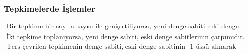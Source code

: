 \subsubsection*{Tepkimelerde İşlemler}
\begin{equation*}
  \begin{aligned}
    \text{Bir tepkime bir sayı n sayısı ile genişletiliyorsa, yeni denge sabiti eski denge sabitinin n üssü alınarak bulunur. } \\
    \text{İki tepkime toplanıyorsa, yeni denge sabiti, eski denge sabitlerinin çarpımıdır. } \\
    \text{Ters çevrilen tepkimenin denge sabiti, eski denge sabitinin -1 üssü alınarak bulunur. }
    \end{aligned}
\end{equation*}

